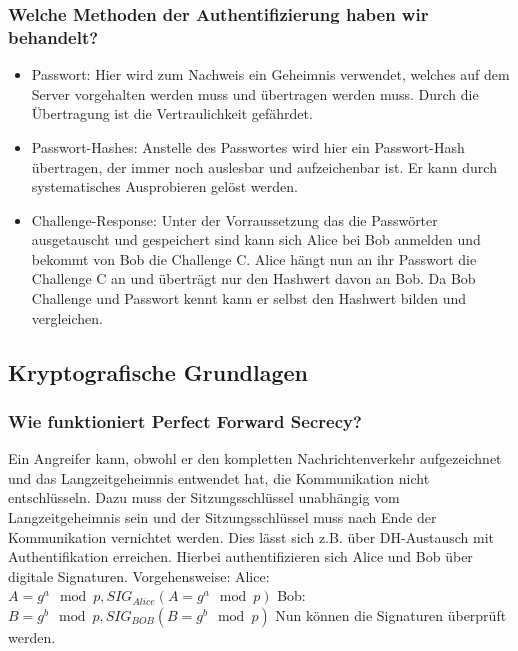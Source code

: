 	\subsubsection{Welche Methoden der Authentifizierung haben wir behandelt?}
	\begin{itemize}
		\item Passwort: Hier wird zum Nachweis ein Geheimnis verwendet, welches auf dem Server vorgehalten werden muss und übertragen werden muss. Durch die Übertragung ist die Vertraulichkeit gefährdet. 
		\item Passwort-Hashes: Anstelle des Passwortes wird hier ein Passwort-Hash übertragen, der immer noch auslesbar und aufzeichenbar ist. Er kann durch systematisches Ausprobieren gelöst werden.
		\item Challenge-Response: Unter der Vorraussetzung das die Passwörter ausgetauscht und gespeichert sind kann sich Alice bei Bob anmelden und bekommt von Bob die Challenge C. Alice hängt nun an ihr Passwort die Challenge C an und überträgt nur den Hashwert davon an Bob. Da Bob Challenge und Passwort kennt kann er selbst den Hashwert bilden und vergleichen.
	\end{itemize}

	\subsection{Kryptografische Grundlagen}
	
	\subsubsection{Wie funktioniert Perfect Forward Secrecy?}
	Ein Angreifer kann, obwohl er den kompletten Nachrichtenverkehr aufgezeichnet und das Langzeitgeheimnis entwendet hat, die Kommunikation nicht entschlüsseln. Dazu muss der Sitzungsschlüssel unabhängig vom Langzeitgeheimnis sein und der Sitzungsschlüssel muss nach Ende der Kommunikation vernichtet werden.\newline
	Dies lässt sich z.B. über DH-Austausch mit Authentifikation erreichen. Hierbei authentifizieren sich Alice und Bob über digitale Signaturen.
	\newline
	Vorgehensweise: \newline
	Alice: $A=g^a \mod p,SIG_{Alice}(A=g^a \mod p)$ \newline
	Bob: $B=g^b \mod p, SIG_{BOB}(B=g^b \mod p)$	\newline
	Nun können die Signaturen überprüft werden.

